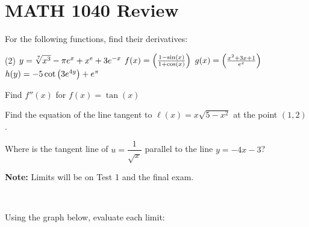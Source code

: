 \documentclass[answers]{exam}
\begin{document}
\section{MATH 1040 Review}
  For the following functions, find their derivatives:
  \begin{tasks}[label=\hspace*{0pt},after-item-skip=\stretch{0.5}](2)
    \task $y=\sqrt[7]{x^3}-\pi e^x+x^e+3e\inv[x]$
    \task $f(x)=\parens{\frac{1-\sin(x)}{1+\cos(x)}}$
    \task $g(x)=\parens{\frac{x^2+3x+1}{e^x}}$
    \task $h(y)=-5\cot\parens{3e^{4y}}+e^\pi$
  \end{tasks}
  Find $f''(x)$ for $f(x)=\tan(x)$
  \pagebreak
  
  Find the equation of the line tangent to $\ell(x)=x\sqrt{5-x^2}$ at the point $(1,2)$.
  
  Where is the tangent line of $u=\dfrac{1}{\sqrt x}$ parallel to the line $y=-4x-3$?
  \pagebreak

  \noindent
  \textbf{Note:} Limits will be on Test 1 and the final exam.
  \begin{ex*}~

  Using the graph below, evaluate each limit:
  \end{ex*}
  
\end{document}
